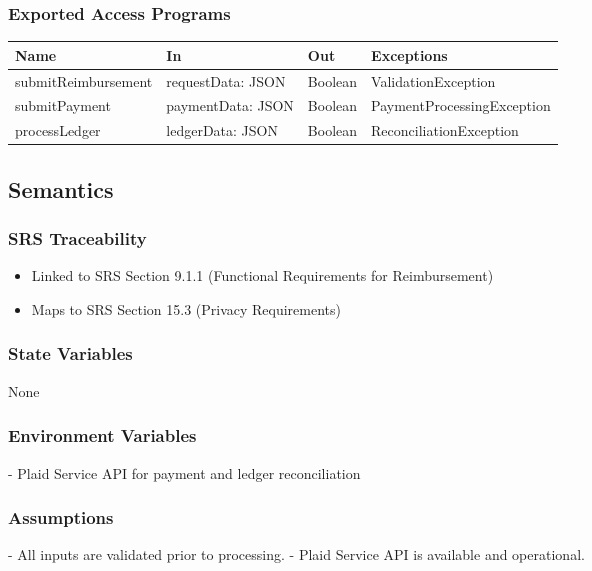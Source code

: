 \documentclass[12pt, titlepage]{article}
\begin{document}
\subsubsection{Exported Access Programs}
\begin{center}
\begin{tabular}{p{4cm} p{4cm} p{4cm} p{2cm}}
\hline
\textbf{Name} & \textbf{In} & \textbf{Out} & \textbf{Exceptions} \\
\hline
submitReimbursement & requestData: JSON & Boolean & ValidationException \\
submitPayment & paymentData: JSON & Boolean & PaymentProcessingException \\
processLedger & ledgerData: JSON & Boolean & ReconciliationException \\
\hline
\end{tabular}
\end{center}

\subsection{Semantics}

\subsubsection{SRS Traceability}
\begin{itemize}
  \item Linked to SRS Section 9.1.1 (Functional Requirements for Reimbursement)
  \item Maps to SRS Section 15.3 (Privacy Requirements)
\end{itemize}

\subsubsection{State Variables}
None

\subsubsection{Environment Variables}
- Plaid Service API for payment and ledger reconciliation

\subsubsection{Assumptions}
- All inputs are validated prior to processing.
- Plaid Service API is available and operational.
\end{document}
